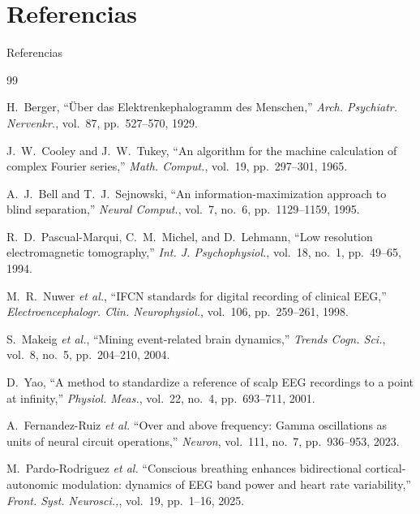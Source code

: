 \section*{Referencias}

\begin{frame}[allowframebreaks]{Referencias}
  \footnotesize
  \begin{thebibliography}{99}

    H.~Berger, ``Über das Elektrenkephalogramm des Menschen,''
    \textit{Arch. Psychiatr. Nervenkr.}, vol.~87, pp.~527--570, 1929.

    J.~W.~Cooley and J.~W.~Tukey, ``An algorithm for the machine calculation of complex Fourier series,''
    \textit{Math. Comput.}, vol.~19, pp.~297--301, 1965.

    A.~J.~Bell and T.~J.~Sejnowski, ``An information-maximization approach to blind separation,''
    \textit{Neural Comput.}, vol.~7, no.~6, pp.~1129--1159, 1995.

    R.~D.~Pascual-Marqui, C.~M.~Michel, and D.~Lehmann,
    ``Low resolution electromagnetic tomography,''
    \textit{Int. J. Psychophysiol.}, vol.~18, no.~1, pp.~49--65, 1994.

    M.~R.~Nuwer \textit{et al.}, ``IFCN standards for digital recording of clinical EEG,''
    \textit{Electroencephalogr. Clin. Neurophysiol.}, vol.~106, pp.~259--261, 1998.

    S.~Makeig \textit{et al.}, ``Mining event-related brain dynamics,''
    \textit{Trends Cogn. Sci.}, vol.~8, no.~5, pp.~204--210, 2004.

    D.~Yao, ``A method to standardize a reference of scalp EEG recordings to a point at infinity,''
    \textit{Physiol. Meas.}, vol.~22, no.~4, pp.~693--711, 2001.
    
    A.~Fernandez-Ruiz \textit{et al.} ``Over and above frequency: Gamma oscillations as units of neural circuit operations,'' \textit{Neuron}, vol.~111, no.~7, pp.~936--953, 2023.
    
    M.~Pardo-Rodriguez \textit{et al.} ``Conscious breathing enhances bidirectional cortical-autonomic modulation: dynamics of EEG band power and heart rate variability,'' \textit{Front. Syst. Neurosci.,}, vol.~19, pp.~1--16, 2025.


\end{thebibliography}
\end{frame}
